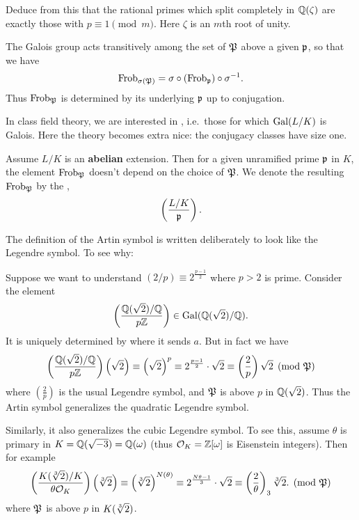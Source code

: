\begin{exercise}
	Deduce from this that the rational primes which split completely
	in $\mathbb Q(\zeta)$ are exactly those with $p \equiv 1 \pmod m$.
	Here $\zeta$ is an $m$th root of unity.
\end{exercise}

The Galois group acts transitively among the set of $\mathfrak P$ above a given $\mathfrak p$,
so that we have
\[ \mathrm{Frob}_{\sigma(\mathfrak P)} = \sigma \circ (\mathrm{Frob}_{\mathfrak p}) \circ \sigma^{-1}.  \]
Thus $\mathrm{Frob}_\mathfrak P$ is determined by its underlying $\mathfrak p$ up to conjugation.

In class field theory, we are interested in ,
i.e.\ those for which $\operatorname{Gal}(L/K)$ is Galois.
Here the theory becomes extra nice:
the conjugacy classes have size one.
\begin{definition}
	Assume $L/K$ is an \textbf{abelian} extension.
	Then for a given unramified prime $\mathfrak p$ in $K$,
	the element $\mathrm{Frob}_\mathfrak P$ doesn't depend on the choice of $\mathfrak P$.
	We denote the resulting $\mathrm{Frob}_\mathfrak P$ by the ,
	\[ \left( \frac{L/K}{\mathfrak p} \right). \]
\end{definition}
The definition of the Artin symbol is written deliberately to
look like the Legendre symbol.
To see why:
\begin{example}
	Suppose we want to understand
	$(2/p) \equiv 2^{\frac{p-1}{2}}$ where $p > 2$ is prime.
	Consider the element
	\[ \left( \frac{\mathbb Q(\sqrt 2)/\mathbb Q}{p\mathbb Z} \right)
		\in \operatorname{Gal}(\mathbb Q(\sqrt 2) / \mathbb Q). \]
	It is uniquely determined by where it sends $a$.
	But in fact we have
	\[
		\left( \frac{\mathbb Q(\sqrt 2)/\mathbb Q}{p\mathbb Z} \right) \left( \sqrt 2 \right)
		\equiv \left( \sqrt 2 \right)^{p}
		\equiv 2^{\frac{p-1}{2}} \cdot \sqrt 2
		\equiv \left( \frac 2p \right) \sqrt 2
		\pmod{\mathfrak P}
	\]
	where $\left( \frac 2p \right)$ is the usual Legendre symbol,
	and $\mathfrak P$ is above $p$ in $\mathbb Q(\sqrt 2)$.
	Thus the Artin symbol generalizes the quadratic Legendre symbol.
\end{example}
\begin{example}
	Similarly, it also generalizes the cubic Legendre symbol.
	To see this, assume $\theta$ is primary in $K = \mathbb Q(\sqrt{-3}) = \mathbb Q(\omega)$
	(thus $\mathcal O_K = \mathbb Z[\omega]$ is Eisenstein integers).
	Then for example
	\[
		\left( \frac{K(\sqrt[3]{2})/K}{\theta \mathcal O_K} \right) \left( \sqrt[3]{2} \right)
		\equiv \left( \sqrt[3]{2} \right)^{N(\theta)}
		\equiv 2^{\frac{N\theta-1}{3}} \cdot \sqrt 2
		\equiv \left( \frac{2}{\theta} \right)_3 \sqrt[3]{2}.
		\pmod{\mathfrak P}
	\]
	where $\mathfrak P$ is above $p$ in $K(\sqrt[3]{2})$.
\end{example}

